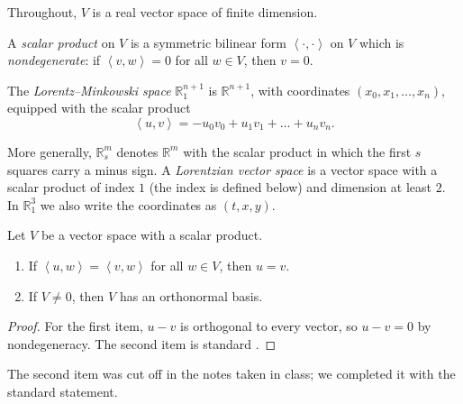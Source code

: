 Throughout, $V$ is a real vector space of
finite dimension.

\begin{definition}
\label{definition-palmas-scalar-product}
A \emph{scalar product} on $V$ is a
symmetric bilinear form
$\left\langle{} \cdot,\cdot \right\rangle{}$
on $V$ which is \emph{nondegenerate}: if
$\left\langle{} v,w \right\rangle{}=0$ for
all $w\in V$, then $v=0$.
\end{definition}

\begin{definition}
\label{definition-palmas-lorentz-minkowski}
The \emph{Lorentz--Minkowski space}
$\mathbb{R}^{n+1}_1$ is $\mathbb{R}^{n+1}$,
with coordinates $(x_0,x_1,\dots,x_n)$,
equipped with the scalar product
$$
\left\langle{} u,v \right\rangle{}
=-u_0v_0+u_1v_1+\dots+u_nv_n.
$$
\end{definition}

More generally, $\mathbb{R}^m_s$ denotes
$\mathbb{R}^m$ with the scalar product in
which the first $s$ squares carry a minus
sign. A \emph{Lorentzian vector space} is
a vector space with a scalar product of
index $1$ (the index is defined below) and
dimension at least $2$. In
$\mathbb{R}^3_1$ we also write the
coordinates as $(t,x,y)$.

\begin{proposition}
\label{proposition-palmas-nondegenerate}
Let $V$ be a vector space with a scalar
product.
\begin{enumerate}
\item If
$\left\langle{} u,w \right\rangle{}
=\left\langle{} v,w \right\rangle{}$
for all $w\in V$, then $u=v$.
\item If $V\neq 0$, then $V$ has an
orthonormal basis.
\end{enumerate}
\end{proposition}

\begin{proof}
For the first item, $u-v$ is orthogonal to
every vector, so $u-v=0$ by
nondegeneracy. The second item is standard
\cite{oneill}.
\end{proof}

The second item was cut off in the notes
taken in class; we completed it with the
standard statement.

